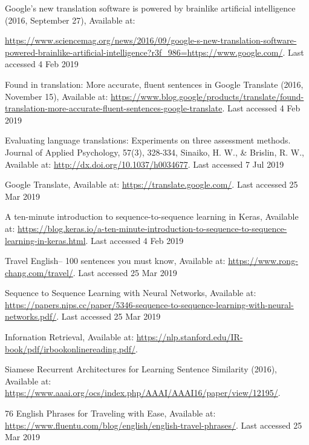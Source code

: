 \documentclass[runningheads]{llncs}
\begin{document}
\begin{thebibliography}{8}
	
	
	\sloppy
	Google’s new translation software is powered by brainlike artificial intelligence (2016, September 27), Available at:

	\url{https://www.sciencemag.org/news/2016/09/google-s-new-translation-software-powered-brainlike-artificial-intelligence?r3f\_986=https://www.google.com/}.  Last accessed 4 Feb 2019
	
	
	Found in translation: More accurate, fluent sentences in Google Translate (2016, November 15), Available at: \url{https://www.blog.google/products/translate/found-translation-more-accurate-fluent-sentences-google-translate}.  Last accessed 4 Feb 2019

	Evaluating language translations: Experiments on three assessment methods. Journal of Applied Psychology, 57(3), 328-334, Sinaiko, H. W., \& Brislin, R. W., Available at: \url{http://dx.doi.org/10.1037/h0034677}.  Last accessed 7 Jul 2019


	Google Translate, Available at: \url{https://translate.google.com/}.  Last accessed 25 Mar 2019

	A ten-minute introduction to sequence-to-sequence learning in Keras, Available at: \url{https://blog.keras.io/a-ten-minute-introduction-to-sequence-to-sequence-learning-in-keras.html}.  Last accessed 4 Feb 2019

	Travel English-- 100 sentences you must know, Available at: \url{https://www.rong-chang.com/travel/}.  Last accessed 25 Mar 2019

Sequence to Sequence Learning with Neural Networks, Available at: \url{https://papers.nips.cc/paper/5346-sequence-to-sequence-learning-with-neural-networks.pdf/}.  Last accessed 25 Mar 2019

Infornation Retrieval, Available at: 
\url{https://nlp.stanford.edu/IR-book/pdf/irbookonlinereading.pdf/}.

Siamese Recurrent Architectures for Learning Sentence Similarity (2016), Available at:
\url{https://www.aaai.org/ocs/index.php/AAAI/AAAI16/paper/view/12195/}.

	76 English Phrases for Traveling with Ease, Available at: \url{https://www.fluentu.com/blog/english/english-travel-phrases/}.  Last accessed 25 Mar 2019


\end{thebibliography}
\end{document}
